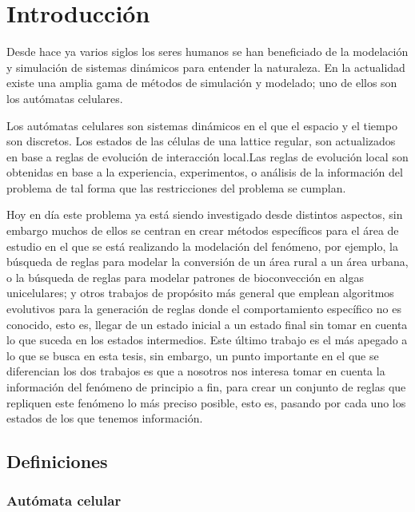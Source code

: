 \pagebreak  %
\cleardoublepage
\pagestyle{headings}

\chapter{Introducción}
%
Desde hace ya varios siglos los seres humanos se han beneficiado de la modelación y simulación de sistemas dinámicos para entender la naturaleza. En la actualidad existe una amplia gama de métodos de simulación y modelado;  uno de ellos son los autómatas celulares. 

Los autómatas celulares son sistemas dinámicos en el que el espacio y el tiempo son discretos. Los estados de las células de una lattice regular, son
actualizados en base a reglas de evolución de interacción local.Las reglas de evolución local son obtenidas en base a la experiencia, experimentos, o análisis de la información del problema de tal forma que las restricciones del problema se cumplan.

Hoy en día este problema ya está siendo investigado desde distintos aspectos, sin embargo muchos de ellos se centran en crear métodos específicos para el área de estudio en el que se está realizando la modelación del fenómeno, por ejemplo, la búsqueda de reglas para modelar la conversión de un área rural a un área urbana, o la búsqueda de reglas para modelar patrones de bioconvección en algas unicelulares; y otros trabajos de propósito más general que emplean algoritmos evolutivos para la generación de reglas donde el comportamiento específico no es conocido, esto es, llegar de un estado inicial a un estado final sin tomar en cuenta lo que suceda en los estados intermedios.
Este último trabajo es el más apegado a lo que se busca en esta tesis, sin embargo, un punto importante en el que se diferencian los dos trabajos es que a nosotros nos interesa tomar en cuenta la información del fenómeno de principio a fin, para crear un conjunto de reglas que repliquen este fenómeno lo más preciso posible, esto es, pasando por cada uno los estados de los que tenemos información.

\section{Definiciones}

\subsection{Autómata celular}


